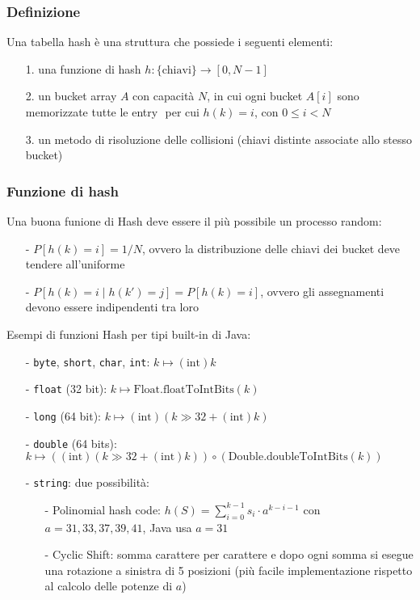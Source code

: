 \documentclass[a4paper]{article}
\begin{document}
\subsubsection*{Definizione}
Una tabella hash è una struttura che possiede i seguenti elementi:
\begin{itemize}[topsep=3pt, itemsep=0pt]
	\item[1.] una funzione di hash \(h : \{\text{chiavi}\} \to [0,N-1]\)
	\item[2.] un bucket array \(A\) con capacità \(N\), in cui ogni bucket \(A[i]\) sono memorizzate tutte le entry \(<k,v>\) per
	cui \(h(k) = i\), con \(0 \leq i < N\)
	\item[3.] un metodo di risoluzione delle collisioni (chiavi distinte associate allo stesso bucket)
\end{itemize}

\subsubsection*{Funzione di hash}
Una buona funione di Hash deve essere il più possibile un processo random:
\begin{itemize}[topsep=3pt, itemsep=0pt]
	\item[-] \(P[h(k) = i] = 1/N\), ovvero la distribuzione delle chiavi dei bucket deve tendere all'uniforme
	\item[-] \(P[h(k) = i \; | \;  h(k') = j] = P[h(k) = i]\), ovvero gli assegnamenti devono essere indipendenti tra loro
\end{itemize}
Esempi di funzioni Hash per tipi built-in di Java:
\begin{itemize}[topsep=3pt, itemsep=0pt]
	\item[-] \verb|byte|, \verb|short|, \verb|char|, \verb|int|: \(k \mapsto (\text{int})k\)
	\item[-] \verb|float| (32 bit): \(k \mapsto \text{Float.floatToIntBits}(k)\)
	\item[-] \verb|long| (64 bit): \(k \mapsto (\text{int})(k \gg 32 + (\text{int})k)\)
	\item[-] \verb|double| (64 bits): \(k \mapsto ((\text{int})(k \gg 32 + (\text{int})k)) \circ (\text{Double.doubleToIntBits}(k))\)
	\item[-] \verb|string|: due possibilità:
	\begin{itemize}[topsep=0pt, itemsep=0pt]
		\item[-] Polinomial hash code: \(h(S) = \sum_{i=0}^{k-1} s_i \cdot a^{k-i-1}\) con \(a = 31, 33, 37, 39, 41\), Java usa \(a=31\)
		\item[-] Cyclic Shift: somma carattere per carattere e dopo ogni somma si esegue una rotazione a sinistra di 5 posizioni
		(più facile implementazione rispetto al calcolo delle potenze di \(a\))
	\end{itemize}
\end{itemize}
\end{document}
